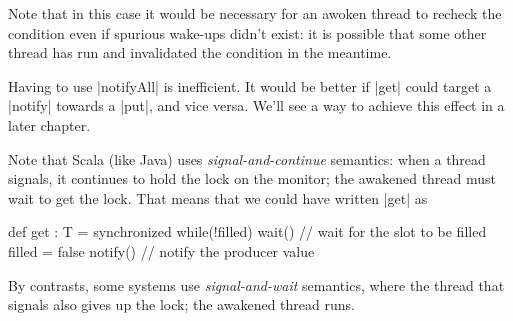 
\begin{slide}

Note that in this case it would be necessary for an awoken thread to recheck
the condition even if spurious wake-ups didn't exist: it is possible that some
other thread has run and invalidated the condition in the meantime.

Having to use |notifyAll| is inefficient.  It would be better if |get| could
target a |notify| towards a |put|, and vice versa.  We'll see a way to achieve
this effect in a later chapter.
\end{slide}


\begin{slide}

Note that Scala (like Java) uses \emph{signal-and-continue} semantics: when a
thread signals, it continues to hold the lock on the monitor; the
awakened thread must wait to get the lock.  That means that we could have
written |get| as 
%
\begin{scala}
  def get : T = synchronized{
    while(!filled) wait() // wait for the slot to be filled
    filled = false
    notify() // notify the producer
    value
  }
\end{scala}

By contrasts, some systems use \emph{signal-and-wait} semantics, where the
thread that signals also gives up the lock; the awakened thread runs.
\end{slide}









